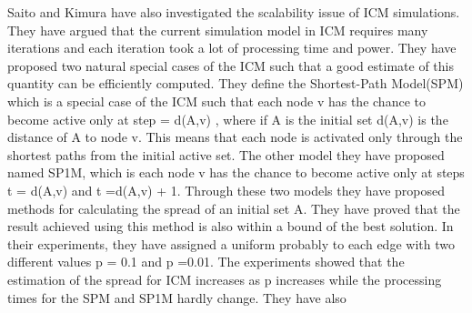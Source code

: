 \documentclass[english]{tktltiki}
\begin{document}
Saito and Kimura \cite{kimura06} have also investigated the scalability issue of ICM simulations. They have argued that the current simulation model in ICM requires many iterations and each iteration took a lot of processing time and power. They have proposed two natural special cases of the ICM such that a good estimate of this quantity can be efficiently computed. They define the Shortest-Path Model(SPM) which is a special case of the ICM such that each node v has the chance to become active only at step = d(A,v) , where if A is the initial set d(A,v) is the distance of A to node v. This means that each node is activated only through the shortest paths from the initial active set. The other model they have proposed named SP1M, which is each node v has the chance to become active only at steps t = d(A,v) and t =d(A,v) + 1. Through these two models they have proposed methods for calculating the spread of an initial set A. They have proved that the result achieved using this method is also within a bound of the best solution. In their experiments, they have assigned a uniform probably to each edge with two different values p = 0.1 and p =0.01. The experiments showed that the estimation of the spread for ICM increases as p increases while the processing times for the SPM and SP1M hardly change. They have also \\
\end{document}
